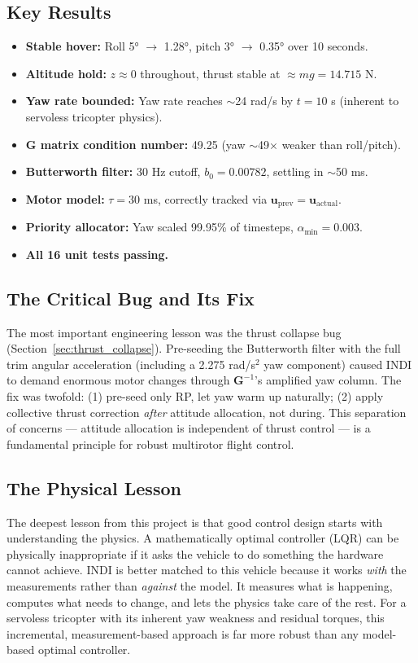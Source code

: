 \documentclass[12pt, a4paper]{article}
\newcommand{\bu}{\bm{u}}
\begin{document}
\subsection{Key Results}

\begin{itemize}
    \item \textbf{Stable hover:} Roll 5° $\to$ 1.28°, pitch 3° $\to$ 0.35° over 10 seconds.
    \item \textbf{Altitude hold:} $z \approx 0$ throughout, thrust stable at $\approx mg = 14.715$ N.
    \item \textbf{Yaw rate bounded:} Yaw rate reaches $\sim$24 rad/s by $t = 10$ s (inherent to servoless tricopter physics).
    \item \textbf{G matrix condition number:} 49.25 (yaw $\sim$49$\times$ weaker than roll/pitch).
    \item \textbf{Butterworth filter:} 30 Hz cutoff, $b_0 = 0.00782$, settling in $\sim$50 ms.
    \item \textbf{Motor model:} $\tau = 30$ ms, correctly tracked via $\bu_{\text{prev}} = \bu_{\text{actual}}$.
    \item \textbf{Priority allocator:} Yaw scaled 99.95\% of timesteps, $\alpha_{\min} = 0.003$.
    \item \textbf{All 16 unit tests passing.}
\end{itemize}

\subsection{The Critical Bug and Its Fix}

The most important engineering lesson was the thrust collapse bug (Section~\ref{sec:thrust_collapse}).  Pre-seeding the Butterworth filter with the full trim angular acceleration (including a 2.275 rad/s$^2$ yaw component) caused INDI to demand enormous motor changes through $\bm{G}^{-1}$'s amplified yaw column.  The fix was twofold: (1) pre-seed only RP, let yaw warm up naturally; (2) apply collective thrust correction \emph{after} attitude allocation, not during.  This separation of concerns --- attitude allocation is independent of thrust control --- is a fundamental principle for robust multirotor flight control.

\subsection{The Physical Lesson}

The deepest lesson from this project is that good control design starts with understanding the physics.  A mathematically optimal controller (LQR) can be physically inappropriate if it asks the vehicle to do something the hardware cannot achieve.  INDI is better matched to this vehicle because it works \emph{with} the measurements rather than \emph{against} the model.  It measures what is happening, computes what needs to change, and lets the physics take care of the rest.  For a servoless tricopter with its inherent yaw weakness and residual torques, this incremental, measurement-based approach is far more robust than any model-based optimal controller.
\end{document}
